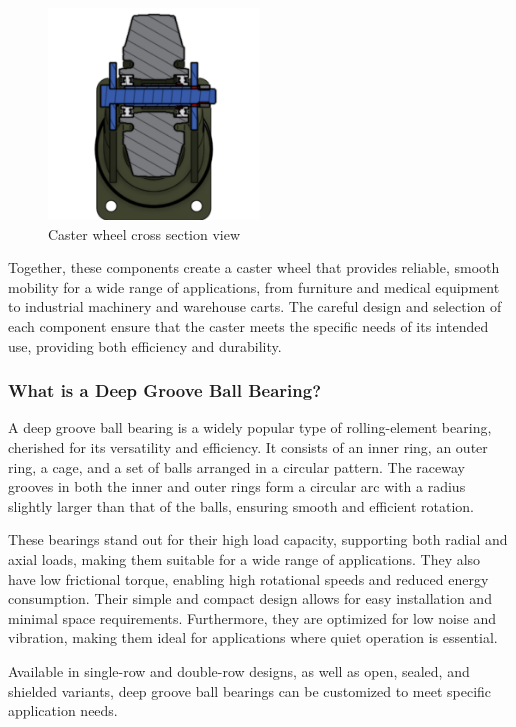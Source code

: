 \documentclass[../../main]{subfiles}
\begin{document}
\begin{figure}[h!]
  \centering
  \includegraphics[width=0.5\textwidth]{img/Picture3.png}
  \caption{Caster wheel cross section view}
  \end{figure}

  Together, these components create a caster wheel that provides reliable, smooth mobility for a wide range of applications, from furniture and medical equipment to industrial machinery and warehouse carts. The careful design and selection of each component ensure that the caster meets the specific needs of its intended use, providing both efficiency and durability.

  \subsubsection{What is a Deep Groove Ball Bearing?}
A deep groove ball bearing is a widely popular type of rolling-element bearing, cherished for its versatility and efficiency. It consists of an inner ring, an outer ring, a cage, and a set of balls arranged in a circular pattern. The raceway grooves in both the inner and outer rings form a circular arc with a radius slightly larger than that of the balls, ensuring smooth and efficient rotation. 

These bearings stand out for their high load capacity, supporting both radial and axial loads, making them suitable for a wide range of applications. They also have low frictional torque, enabling high rotational speeds and reduced energy consumption. Their simple and compact design allows for easy installation and minimal space requirements. Furthermore, they are optimized for low noise and vibration, making them ideal for applications where quiet operation is essential.

Available in single-row and double-row designs, as well as open, sealed, and shielded variants, deep groove ball bearings can be customized to meet specific application needs.
\end{document}
